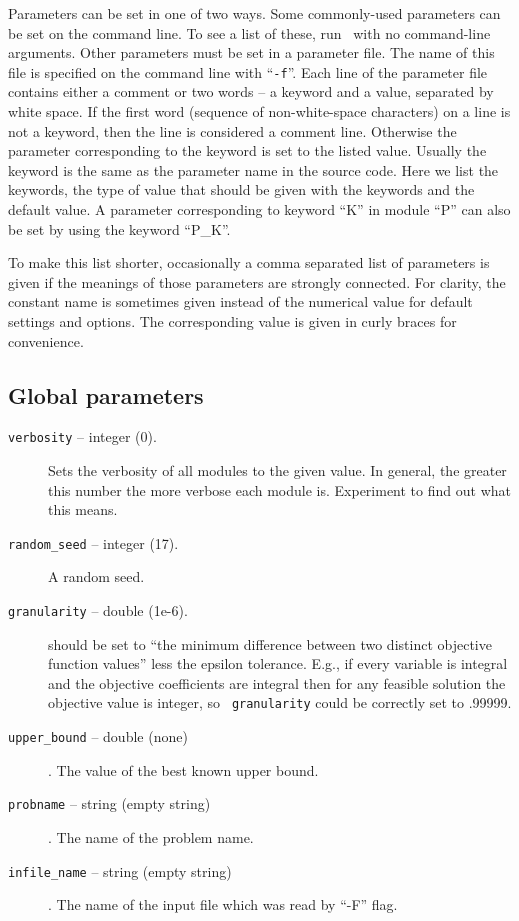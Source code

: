 \label{parameter_file}
Parameters can be set in one of two ways. Some commonly-used parameters can be
set on the command line. To see a list of these, run \BB\ with no command-line
arguments. Other parameters must be set in a parameter file. The name of this
file is specified on the command line with ``\texttt{-f}''.  Each line of the
parameter file contains either a comment or two words -- a keyword and a
value, separated by white space. If the first word (sequence of
non-white-space characters) on a line is not a keyword, then the line is
considered a comment line. Otherwise the parameter corresponding to the
keyword is set to the listed value. Usually the keyword is the same as the
parameter name in the source code. Here we list the keywords, the type of
value that should be given with the keywords and the default value. A
parameter corresponding to keyword ``K'' in module ``P'' can also be set by
using the keyword ``P\_K''.

To make this list shorter, occasionally a comma separated list of parameters
is given if the meanings of those parameters are strongly
connected. For clarity, the constant name is sometimes given instead
of the numerical value for default settings and options. The
corresponding value is given in curly braces for convenience.

\subsection{Global parameters}
\begin{description}

\item[{\tt verbosity} -- integer (0).]
Sets the verbosity of all modules to the given value. In general,
the greater this number the more verbose each module is. Experiment
to find out what this means.

\item[{\tt random\_seed} -- integer (17).]
A random seed.

\item[{\tt granularity} -- double (1e-6).]
should be set to ``the minimum difference between two distinct
objective function values'' less the epsilon tolerance. E.g., if every
variable is integral and the objective coefficients are integral then
for any feasible solution the objective value is integer, so {\tt
granularity} could be correctly set to .99999.

\item[{\tt upper\_bound} -- double (none)].
The value of the best known upper bound.

\item[{\tt probname} -- string (empty string)].
The name of the problem name.

\item[{\tt infile\_name} -- string (empty string)].
The name of the input file which was read by ``-F'' flag.

\end{description}

